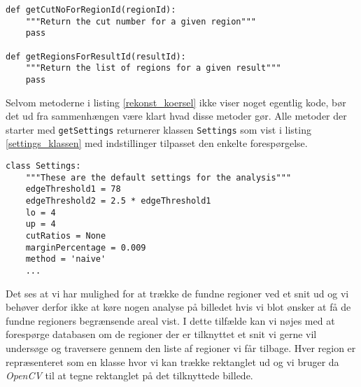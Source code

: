 {\begin{lstlisting}[caption={Metoder til rekonstruktion af kørsler},captionpos=b,label={rekonst_koersel},numbers=none]
def getCutNoForRegionId(regionId):
    """Return the cut number for a given region"""
    pass

def getRegionsForResultId(resultId):
    """Return the list of regions for a given result"""
    pass
\end{lstlisting}

Selvom metoderne i listing \ref{rekonst_koersel} ikke viser noget
egentlig kode, bør det ud fra sammenhængen være klart hvad disse metoder
gør. Alle metoder der starter med \texttt{getSettings} returnerer
klassen \texttt{Settings} som vist i listing \ref{settings_klassen} med
indstillinger tilpasset den enkelte forespørgelse.
\vspace{0.5cm}
\begin{lstlisting}[caption={Settings-klassen med standardindstillinger},captionpos=b,label={settings_klassen},numbers=none]
class Settings:
    """These are the default settings for the analysis"""
    edgeThreshold1 = 78
    edgeThreshold2 = 2.5 * edgeThreshold1
    lo = 4
    up = 4
    cutRatios = None
    marginPercentage = 0.009
    method = 'naive'
    ...
\end{lstlisting}

Det ses at vi har mulighed for at trække de fundne regioner ved et
snit ud og vi behøver derfor ikke at køre nogen analyse på billedet hvis
vi blot ønsker at få de fundne regioners begrænsende areal vist. I dette
tilfælde kan vi nøjes med at forespørge databasen om de regioner der er
tilknyttet et snit vi gerne vil undersøge og traversere gennem den liste
af regioner vi får tilbage. Hver region er repræsenteret som en klasse
hvor vi kan trække rektanglet ud og vi bruger da \emph{OpenCV} til at
tegne rektanglet på det tilknyttede billede.

}


